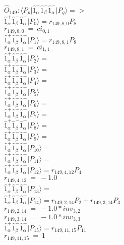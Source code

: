 \documentclass[14pt]{article}
\begin{document}
    $\hat{O}_{149}:  \langle{P_p}\vert \hat{1}_{\alpha}^{+}\hat{1}_{\beta}^{-}\hat{1}_{\alpha}^{-} \vert{P_q}\rangle => $ \\ 
    $ \hat{1}_{\alpha}^{+}\hat{1}_{\beta}^{-}\hat{1}_{\alpha}^{-} \vert{P_{0}}\rangle = {r}_{149,8,0}P_{8} $ \\ 
    ${r}_{149,8,0}\ =\ {ci}_{0,1} $ \\ 
    $ \hat{1}_{\alpha}^{+}\hat{1}_{\beta}^{-}\hat{1}_{\alpha}^{-} \vert{P_{1}}\rangle = {r}_{149,8,1}P_{8} $ \\ 
    ${r}_{149,8,1}\ =\ {ci}_{1,1} $ \\ 
    $ \hat{1}_{\alpha}^{+}\hat{1}_{\beta}^{-}\hat{1}_{\alpha}^{-} \vert{P_{2}}\rangle =  $ \\ 
    $ \hat{1}_{\alpha}^{+}\hat{1}_{\beta}^{-}\hat{1}_{\alpha}^{-} \vert{P_{3}}\rangle =  $ \\ 
    $ \hat{1}_{\alpha}^{+}\hat{1}_{\beta}^{-}\hat{1}_{\alpha}^{-} \vert{P_{4}}\rangle =  $ \\ 
    $ \hat{1}_{\alpha}^{+}\hat{1}_{\beta}^{-}\hat{1}_{\alpha}^{-} \vert{P_{5}}\rangle =  $ \\ 
    $ \hat{1}_{\alpha}^{+}\hat{1}_{\beta}^{-}\hat{1}_{\alpha}^{-} \vert{P_{6}}\rangle =  $ \\ 
    $ \hat{1}_{\alpha}^{+}\hat{1}_{\beta}^{-}\hat{1}_{\alpha}^{-} \vert{P_{7}}\rangle =  $ \\ 
    $ \hat{1}_{\alpha}^{+}\hat{1}_{\beta}^{-}\hat{1}_{\alpha}^{-} \vert{P_{8}}\rangle =  $ \\ 
    $ \hat{1}_{\alpha}^{+}\hat{1}_{\beta}^{-}\hat{1}_{\alpha}^{-} \vert{P_{9}}\rangle =  $ \\ 
    $ \hat{1}_{\alpha}^{+}\hat{1}_{\beta}^{-}\hat{1}_{\alpha}^{-} \vert{P_{10}}\rangle =  $ \\ 
    $ \hat{1}_{\alpha}^{+}\hat{1}_{\beta}^{-}\hat{1}_{\alpha}^{-} \vert{P_{11}}\rangle =  $ \\ 
    $ \hat{1}_{\alpha}^{+}\hat{1}_{\beta}^{-}\hat{1}_{\alpha}^{-} \vert{P_{12}}\rangle = {r}_{149,4,12}P_{4} $ \\ 
    ${r}_{149,4,12}\ =\ -1.0 $ \\ 
    $ \hat{1}_{\alpha}^{+}\hat{1}_{\beta}^{-}\hat{1}_{\alpha}^{-} \vert{P_{13}}\rangle =  $ \\ 
    $ \hat{1}_{\alpha}^{+}\hat{1}_{\beta}^{-}\hat{1}_{\alpha}^{-} \vert{P_{14}}\rangle = {r}_{149,2,14}P_{2}+{r}_{149,3,14}P_{3} $ \\ 
    ${r}_{149,2,14}\ =\ -1.0*{inv}_{3,2} $ \\ 
    ${r}_{149,3,14}\ =\ -1.0*{inv}_{3,3} $ \\ 
    $ \hat{1}_{\alpha}^{+}\hat{1}_{\beta}^{-}\hat{1}_{\alpha}^{-} \vert{P_{15}}\rangle = {r}_{149,11,15}P_{11} $ \\ 
    ${r}_{149,11,15}\ =\ 1 $ \\ 
    
\end{document}
